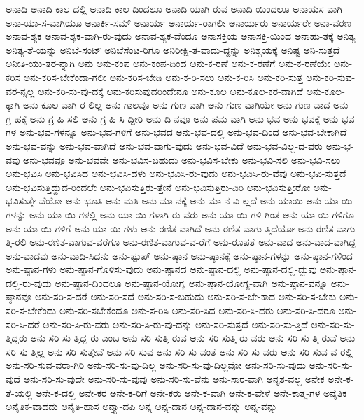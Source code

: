 {ಅನಾದಿ
ಅನಾದಿ-ಕಾಲ-ದಲ್ಲಿ
ಅನಾದಿ-ಕಾಲ-ದಿಂದಲೂ
ಅನಾದಿ-ಯಾಗಿ-ರುವ
ಅನಾದಿ-ಯಿಂದಲೂ
ಅನಾಯಸ-ವಾಗಿ
ಅನಾ-ಯಾ-ಸ-ವಾಗಿಯೂ
ಅನಾರ್ಕಿ-ಸಮ್
ಅನಾರ್ಯ
ಅನಾರ್ಯ-ರಾಗಲೀ
ಅನಾರ್ಯರು
ಅನಾರ್ಯರೇ
ಅನಾ-ವರಣ
ಅನಾವ-ಶ್ಯಕ
ಅನಾವ-ಶ್ಯಕ-ವಾಗಿ-ರು-ವುದು
ಅನಾವ-ಶ್ಯಕ-ವೆಂದೂ
ಅನಾಸಕ್ತಿಯ
ಅನಾಸಕ್ತಿ-ಯಿಂದ
ಅನಾಹು-ತಕ್ಕೆ
ಅನಿತ್ಯ
ಅನಿತ್ಯ-ತೆ-ಯನ್ನು
ಅನಿಬೆ-ಸಂಟ್
ಅನಿಬೆಸೆಂಟ-ರಿಗೂ
ಅನಿರೀಕ್ಷಿ-ತ-ವಾದು-ದ್ದನ್ನು
ಅನಿಶ್ಚಯಕ್ಕೆ
ಅನಿಷ್ಟ
ಅನಿ-ಸುತ್ತದೆ
ಅನೀತಿ-ಯು-ತರ-ನ್ನಾಗಿ
ಅನು
ಅನು-ಕಂಪ
ಅನು-ಕಂಪ-ದಿಂದ
ಅನು-ಕ-ರಣೆ
ಅನು-ಕ-ರಣೆಗೆ
ಅನು-ಕ-ರಣೆಯೇ
ಅನು-ಕರಿಸ
ಅನು-ಕರಿಸ-ಬೇಕೆಂದಾ-ಗಲೀ
ಅನು-ಕರಿಸ-ಬೇಡಿ
ಅನು-ಕ-ರಿ-ಸಲು
ಅನು-ಕ-ರಿಸಿ
ಅನು-ಕರಿ-ಸುತ್ತ
ಅನು-ಕರಿ-ಸುವ-ವರ-ನ್ನಲ್ಲ
ಅನು-ಕರಿ-ಸು-ವು-ದಕ್ಕೆ
ಅನು-ಕರಿಸುವುದರಿಂದೇನೂ
ಅನು-ಕೂಲ
ಅನು-ಕೂಲ-ಕರ-ವಾಗಿದೆ
ಅನು-ಕೂಲ-ಕ್ಕಾಗಿ
ಅನು-ಕೂಲ-ವಾಗಿ-ರ-ಲಿಲ್ಲ
ಅನು-ಗಾಲವೂ
ಅನು-ಗುಣ-ವಾಗಿ
ಅನು-ಗುಣ-ವಾಗಿಯೇ
ಅನು-ಗುಣ-ವಾದ
ಅನು-ಗ್ರ-ಹಕ್ಕೆ
ಅನು-ಗ್ರ-ಹಿ-ಸಲಿ
ಅನು-ಗ್ರ-ಹಿ-ಸಿ-ದ್ದೀರಿ
ಅನು-ದಿ-ನವೂ
ಅನು-ಪಮ-ವಾಗಿ
ಅನು-ಭವ
ಅನು-ಭವಕ್ಕೆ
ಅನು-ಭವ-ಗಳ
ಅನು-ಭವ-ಗಳನ್ನೂ
ಅನು-ಭವ-ಗಳಿಗೆ
ಅನು-ಭವದ
ಅನು-ಭವ-ದಲ್ಲಿ
ಅನು-ಭವ-ದಿಂದ
ಅನು-ಭವ-ಬೇಕಾಗಿದೆ
ಅನು-ಭವ-ವನ್ನು
ಅನು-ಭವ-ವಾಗಿದೆ
ಅನು-ಭವ-ವಾಗು-ವುದು
ಅನು-ಭವ-ವಿದೆ
ಅನು-ಭವ-ವಿಲ್ಲ-ದ-ವರು
ಅನು-ಭ-ವವು
ಅನು-ಭವವೂ
ಅನು-ಭವವೇ
ಅನು-ಭವಿಸ-ಬಹುದು
ಅನು-ಭವಿಸ-ಬೇಕು
ಅನು-ಭವಿ-ಸಲಿ
ಅನು-ಭವಿ-ಸಲು
ಅನು-ಭವಿಸಿ
ಅನು-ಭವಿಸಿದ
ಅನು-ಭವಿಸಿ-ದಳು
ಅನು-ಭವಿಸಿ-ರು-ವುದು
ಅನು-ಭವಿಸಿ-ರು-ವೆವು
ಅನು-ಭವಿ-ಸುತ್ತದೆ
ಅನು-ಭವಿಸುತ್ತಿದ್ದುದ-ರಿಂದಲೇ
ಅನು-ಭವಿಸುತ್ತಿರು-ತ್ತೇನೆ
ಅನು-ಭವಿಸುತ್ತಿರು-ವಿರಿ
ಅನು-ಭವಿಸುತ್ತೀರೋ
ಅನು-ಭವಿಸುತ್ತೇ-ವೆಯೋ
ಅನು-ಭೂತಿ
ಅನು-ಮತಿ
ಅನು-ಮಾ-ನಕ್ಕೆ
ಅನು-ಮಾ-ನ-ವಿ-ಲ್ಲದೆ
ಅನು-ಯಾಯಿ
ಅನು-ಯಾ-ಯಿ-ಗಳನ್ನು
ಅನು-ಯಾ-ಯಿ-ಗಳಲ್ಲಿ
ಅನು-ಯಾ-ಯಿ-ಗಳಾಗಿ-ರು-ವರು
ಅನು-ಯಾ-ಯಿ-ಗಳಿ-ಗಿಂತ
ಅನು-ಯಾ-ಯಿ-ಗಳಿಗೂ
ಅನು-ಯಾ-ಯಿ-ಗಳಿಗೆ
ಅನು-ಯಾ-ಯಿ-ಗಳು
ಅನು-ರಣಿತ-ವಾಗಿದೆ
ಅನು-ರಣಿತ-ವಾಗು-ತ್ತಿದೆಯೋ
ಅನು-ರಣಿತ-ವಾಗು-ತ್ತಿ-ರಲಿ
ಅನು-ರಣಿತ-ವಾಗುವ-ವರೆಗೂ
ಅನು-ರಣಿತ-ವಾಗುವ-ವ-ರೆಗೆ
ಅನು-ರೂಪತೆ
ಅನು-ವಾದ
ಅನು-ವಾದ-ವಾಗಿದ್ದ
ಅನು-ವಾದವು
ಅನು-ವಾದಿ-ಸಿದನು
ಅನು-ಷ್ಟುಪ್
ಅನು-ಷ್ಠಾನ
ಅನು-ಷ್ಠಾನಕ್ಕೆ
ಅನು-ಷ್ಠಾನ-ಗಳನ್ನು
ಅನು-ಷ್ಠಾನ-ಗಳಿಂದ
ಅನು-ಷ್ಠಾನ-ಗಳು
ಅನು-ಷ್ಠಾನ-ಗೊಳಿಸು-ವುದು
ಅನು-ಷ್ಠಾನದ
ಅನು-ಷ್ಠಾನ-ದಲ್ಲಿ
ಅನು-ಷ್ಠಾನ-ದಲ್ಲಿ-ದ್ದುವು
ಅನು-ಷ್ಠಾನ-ದಲ್ಲಿ-ರು-ವುದು
ಅನು-ಷ್ಠಾನ-ದಿಂದಲೂ
ಅನು-ಷ್ಠಾನ-ಯೋಗ್ಯ
ಅನು-ಷ್ಠಾನ-ಯೋಗ್ಯ-ವಾಗಿ
ಅನು-ಷ್ಠಾನ-ವನ್ನೂ
ಅನು-ಷ್ಠಾನವೂ
ಅನು-ಸರಿ-ಸ-ದರೆ
ಅನು-ಸರಿ-ಸದೆ
ಅನು-ಸರಿ-ಸ-ಬಹುದು
ಅನು-ಸರಿ-ಸ-ಬೇ-ಕಾದ
ಅನು-ಸರಿ-ಸ-ಬೇಕು
ಅನು-ಸರಿ-ಸ-ಬೇಕೆಂದು
ಅನು-ಸರಿ-ಸಬೇಕೆಂದೂ
ಅನು-ಸ-ರಿಸಿ
ಅನು-ಸರಿ-ಸಿದ
ಅನು-ಸರಿ-ಸಿ-ದರು
ಅನು-ಸರಿ-ಸಿ-ದರೂ
ಅನು-ಸರಿ-ಸಿ-ದರೆ
ಅನು-ಸರಿ-ಸಿ-ರು-ವರು
ಅನು-ಸರಿ-ಸಿ-ರು-ವು-ದನ್ನು
ಅನು-ಸರಿ-ಸುತ್ತದೆ
ಅನು-ಸರಿ-ಸು-ತ್ತಿದೆ
ಅನು-ಸರಿ-ಸು-ತ್ತಿದ್ದರು
ಅನು-ಸರಿ-ಸು-ತ್ತಿದ್ದ-ರು-ಎಂಬ
ಅನು-ಸರಿ-ಸುತ್ತಿ-ರುವ
ಅನು-ಸರಿ-ಸುತ್ತಿ-ರು-ವರು
ಅನು-ಸರಿ-ಸು-ತ್ತಿ-ರುವೆ
ಅನು-ಸರಿ-ಸು-ತ್ತಿಲ್ಲ
ಅನು-ಸರಿ-ಸುತ್ತೇವೆ
ಅನು-ಸರಿ-ಸುವ
ಅನು-ಸರಿ-ಸು-ವಂತೆ
ಅನು-ಸರಿ-ಸು-ವರು
ಅನು-ಸರಿ-ಸುವ-ವ-ರಲ್ಲಿ
ಅನು-ಸರಿ-ಸುವ-ವರಾ-ಗಿರಿ
ಅನು-ಸರಿ-ಸು-ವು-ದಿಲ್ಲ
ಅನು-ಸರಿ-ಸು-ವು-ದಿಲ್ಲವೋ
ಅನು-ಸರಿ-ಸು-ವುದು
ಅನು-ಸರಿ-ಸು-ವುದೆ
ಅನು-ಸರಿ-ಸು-ವುದೇ
ಅನು-ಸರಿ-ಸು-ವುವು
ಅನು-ಸರಿ-ಸು-ವೆನು
ಅನು-ಸಾರ-ವಾಗಿ
ಅನೃತ-ವಲ್ಲ
ಅನೇಕ
ಅನೇ-ಕ-ತೆ-ಯಲ್ಲಿ
ಅನೇ-ಕ-ದಲ್ಲಿ
ಅನೇ-ಕರ
ಅನೇ-ಕ-ರಿಗೆ
ಅನೇ-ಕರು
ಅನೇ-ಕ-ವಾಗಿ
ಅನೇ-ಕ-ವೇಳೆ
ಅನೇ-ಕಾತ್ಮ-ಗಳ
ಅನೈತಿಕ
ಅನೈತಿಕ-ವಾದದು
ಅನೈತಿ-ಹಾಸ
ಅನ್ತ್ಯಾ-ದಪಿ
ಅನ್ನ
ಅನ್ನ-ದಾನ
ಅನ್ನ-ದಾನ-ವನ್ನು
ಅನ್ನ-ವನ್ನು
}
